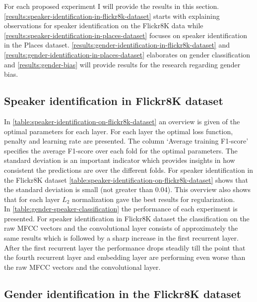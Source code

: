 \documentclass[a4paper, oneside]{book}
\begin{document}
For each proposed experiment I will provide the results in this section. \autoref{results:speaker-identification-in-flickr8k-dataset} starts with explaining observations for speaker identification on the Flickr8K data while \autoref{results:speaker-identification-in-places-dataset} focuses on speaker identification in the Places dataset. \autoref{results:gender-identification-in-flickr8k-dataset} and \autoref{results:gender-identification-in-places-dataset} elaborates on gender classification and \autoref{results:gender-bias} will provide results for the research regarding gender bias.

\subsection{Speaker identification in Flickr8K dataset}\label{results:speaker-identification-in-flickr8k-dataset}

In \autoref{table:speaker-identification-on-flickr8k-dataset} an overview is given of the optimal parameters for each layer. For each layer the optimal loss function, penalty and learning rate are presented. The column ‘Average training F1-score’ specifies the average F1-score over each fold for the optimal parameters. The standard deviation is an important indicator which provides insights in how consistent the predictions are over the different folds. For speaker identification in the Flickr8K dataset \autoref{table:speaker-identification-on-flickr8k-dataset} shows that the standard deviation is small (not greater than 0.04). This overview also shows that for each layer $L_{2}$ normalization gave the best results for regularization. \\

In \autoref{table:gender-speaker-classification} the performance of each experiment is presented. For speaker identification in Flickr8K dataset the classification on the raw MFCC vectors and the convolutional layer consists of approximately the same results which is followed by a sharp increase in the first recurrent layer. After the first recurrent layer the performance drops steadily till the point that the fourth recurrent layer and embedding layer are performing even worse than the raw MFCC vectors and the convolutional layer. 

\subsection{Gender identification in the Flickr8K dataset}\label{results:gender-identification-in-flickr8k-dataset}
\end{document}

